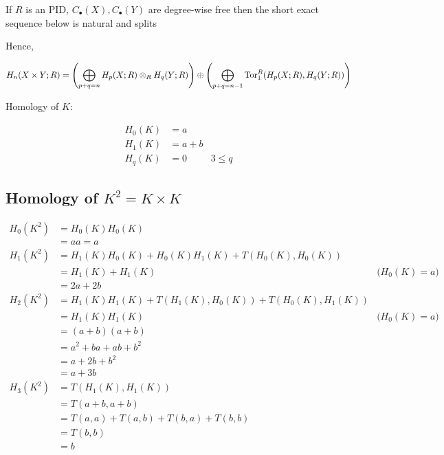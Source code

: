 \documentclass{article}
\begin{document}
\begin{theorem}
    If $R$ is an PID, $C_\bullet(X), C_\bullet(Y)$ are degree-wise free then the short exact sequence below is natural and splits
\begin{center}
\end{center}
\end{theorem}

Hence,

$$
    H_n(X \times Y; R) = \tuple*{\bigoplus_{p+q=n} H_p(X; R) \otimes_R H_q(Y; R)} \oplus \tuple*{\bigoplus_{p+q=n-1} \Tor^R_1(H_p(X; R), H_q(Y; R))}
$$

Homology of $K$:

\begin{align*}
    H_0(K) &= a \\
    H_1(K) &= a + b \\
    H_q(K) &= 0 &\text{$3 \leq q$}
\end{align*}

\subsection{Homology of $K^2 = K \times K$}

\begin{align*}
    H_0(K^2)
    &= H_0(K) H_0(K) \\
    &= aa = a \\
    H_1(K^2)
    &= H_1(K) H_0(K) + H_0(K) H_1(K) + T(H_0(K), H_0(K)) \\
    &= H_1(K) + H_1(K) &\text{($H_0(K) = a$)} \\
    &= 2a + 2b \\
    H_2(K^2)
    &= H_1(K) H_1(K) + T(H_1(K), H_0(K)) + T(H_0(K), H_1(K)) \\
    &= H_1(K) H_1(K) &\text{($H_0(K) = a$)} \\
    &= (a + b) (a + b) \\
    &= a^2 + ba + ab + b^2 \\
    &= a + 2b + b^2 \\
    &= a + 3b \\
    H_3(K^2)
    &= T(H_1(K), H_1(K)) \\
    &= T(a + b, a + b) \\
    &= T(a, a) + T(a, b) + T(b, a) + T(b, b) \\
    &= T(b, b) \\
    &= b
\end{align*}
\end{document}
